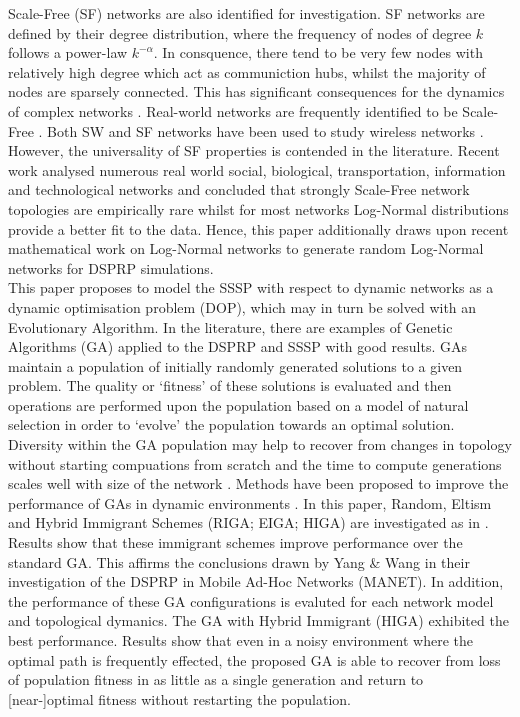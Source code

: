 \documentclass[
	a4paper, %
	10pt, %
	unnumberedsections, %
	twoside, %
]{LTJournalArticle}
\begin{document}
Scale-Free (SF) networks are also identified for investigation. SF networks are defined by their degree distribution, where the frequency of nodes of degree \(k\) follows a power-law \( k^{-\alpha}\). In consquence, there tend to be very few nodes with relatively high degree which act as communiction hubs, whilst the majority of nodes are sparsely connected. This has significant consequences for the dynamics of complex networks \cite{broido:19}. Real-world networks are frequently identified to be Scale-Free \cite{broido:19}. Both SW and SF networks have been used to study wireless networks \cite{sohn:17} \cite{kim:12}. \\

However, the universality of SF properties is contended in the literature. Recent work \cite{broido:19} analysed numerous real world social, biological, transportation, information and technological networks and concluded that strongly Scale-Free network topologies are empirically rare whilst for most networks Log-Normal distributions provide a better fit to the data. Hence, this paper additionally draws upon recent mathematical work on Log-Normal networks \cite{smith:21} to generate random Log-Normal networks for DSPRP simulations. \\

This paper proposes to model the SSSP with respect to dynamic networks as a dynamic optimisation problem (DOP), which may in turn be solved with an Evolutionary Algorithm. In the literature, there are examples of Genetic Algorithms (GA) applied to the DSPRP \cite{kumar:10} \cite{yang:10} and SSSP \cite{yussof:09} with good results. GAs maintain a population of initially randomly generated solutions to a given problem. The quality or `fitness' of these solutions is evaluated and then  operations are performed upon the population based on a model of natural selection in order to `evolve' the population towards an optimal solution. \\ 

Diversity within the GA population may help to recover from changes in topology without starting compuations from scratch and the time to compute generations scales well with size of the network \cite{yang:10}. Methods have been proposed to improve the performance of GAs in dynamic environments \cite{yang:08}. In this paper, Random, Eltism and Hybrid Immigrant Schemes (RIGA; EIGA; HIGA) are investigated as in \cite{yang:10}. \\ 

Results show that these immigrant schemes improve performance over the standard GA. This affirms the conclusions drawn by Yang \& Wang \cite{yang:10} in their investigation of the DSPRP in Mobile Ad-Hoc Networks (MANET). In addition, the performance of these GA configurations is evaluted for each network model and topological dymanics. The GA with Hybrid Immigrant (HIGA) exhibited the best performance. Results show that even in a noisy environment where the optimal path is frequently effected, the proposed GA is able to recover from loss of population fitness in as little as a single generation and return to [near-]optimal fitness without restarting the population. \\
\end{document}
